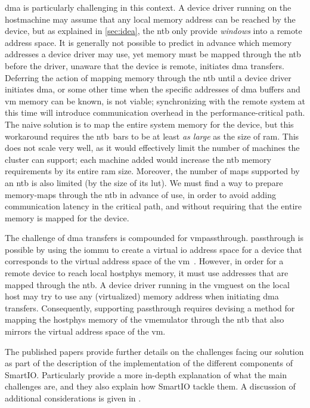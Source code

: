 \Gls{dma} is particularly challenging in this context.
%
A device driver running on the \gls{hostmachine} may assume that any local memory address can be reached by the device, but as explained in \cref{sec:idea}, the \gls{ntb} only provide \emph{windows} into a remote address space.
%
It is generally not possible to predict in advance which memory addresses a device driver may use, yet memory must be mapped through the \gls{ntb} before the driver, unaware that the device is remote, initiates \gls{dma} transfers.
%
Deferring the action of mapping memory through the \gls{ntb} until a device driver initiates \gls{dma}, or some other time when the specific addresses of \gls{dma} buffers and \gls{vm} memory can be known, is not viable;
%
synchronizing with the remote system at this time will introduce communication overhead in the performance-critical path.
%
The naive solution is to map the entire system memory for the device, but this workaround requires the \gls{ntb}~\glspl{bar} to be at least \emph{as large} as the size of \gls{ram}.
%
This does not scale very well, as it would effectively limit the number of machines the cluster can support;
%
each machine added would increase the \gls{ntb} memory requirements by its entire \gls{ram} size.
%
Moreover, the number of maps supported by an \gls{ntb} is also limited (by the size of its \gls{lut}).
%
We must find a way to prepare memory-maps through the \gls{ntb} in advance of use, in order to avoid adding communication latency in the critical path, and without requiring that the entire memory is mapped for the device.



The challenge of \gls{dma} transfers is compounded for \gls{vmpassthrough}.
%
\Gls{passthrough} is possible by using the \gls{iommu} to create a virtual \gls{io} address space for a device that corresponds to the virtual address space of the \gls{vm}~\cite{url:LinuxVFIO,url:LinuxIOMMU,Muli2006}.
%
However, in order for a remote device to reach local \gls{hostphys} memory, it must use addresses that are mapped through the \gls{ntb}.
%
A device driver running in the \gls{vmguest} on the local \gls{host} may try to use any (virtualized) memory address when initiating \gls{dma} transfers.
%
Consequently, supporting \gls{passthrough} requires devising a method for mapping the \gls{hostphys} memory of the \gls{vmemulator} through the \gls{ntb} that also mirrors the virtual address space of the \gls{vm}.



The published papers provide further details on the challenges facing our solution as part of the description of the implementation of the different components of SmartIO.
%
Particularly  provide a more in-depth explanation of what the main challenges are, and they also explain how SmartIO tackle them.
%
A discussion of additional considerations is given in .



